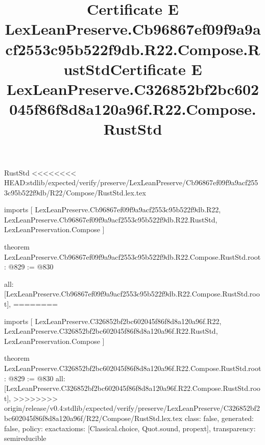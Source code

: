 \begin{lexlean}{RustStd}
<<<<<<<< HEAD:stdlib/expected/verify/preserve/LexLeanPreserve/Cb96867ef09f9a9acf2553c95b522f9db/R22/Compose/RustStd.lex.tex
\title{Certificate E LexLeanPreserve.Cb96867ef09f9a9acf2553c95b522f9db.R22.Compose.RustStd}
\begin{coremodule}
imports [
  LexLeanPreserve.Cb96867ef09f9a9acf2553c95b522f9db.R22,
  LexLeanPreserve.Cb96867ef09f9a9acf2553c95b522f9db.R22.RustStd,
  LexLeanPreservation.Compose
]

theorem LexLeanPreserve.Cb96867ef09f9a9acf2553c95b522f9db.R22.Compose.RustStd.root : @829 := @830 {
  all: [LexLeanPreserve.Cb96867ef09f9a9acf2553c95b522f9db.R22.Compose.RustStd.root],
========
\title{Certificate E LexLeanPreserve.C326852bf2bc602045f86f8d8a120a96f.R22.Compose.RustStd}
\begin{coremodule}
imports [
  LexLeanPreserve.C326852bf2bc602045f86f8d8a120a96f.R22,
  LexLeanPreserve.C326852bf2bc602045f86f8d8a120a96f.R22.RustStd,
  LexLeanPreservation.Compose
]

theorem LexLeanPreserve.C326852bf2bc602045f86f8d8a120a96f.R22.Compose.RustStd.root : @829 := @830 {
  all: [LexLeanPreserve.C326852bf2bc602045f86f8d8a120a96f.R22.Compose.RustStd.root],
>>>>>>>> origin/release/v0.4:stdlib/expected/verify/preserve/LexLeanPreserve/C326852bf2bc602045f86f8d8a120a96f/R22/Compose/RustStd.lex.tex
  class: false,
  generated: false,
  policy: exact{axioms: [Classical.choice, Quot.sound, propext]},
  transparency: semireducible
}


\end{coremodule}}
\end{coremodule}
\end{lexlean}
